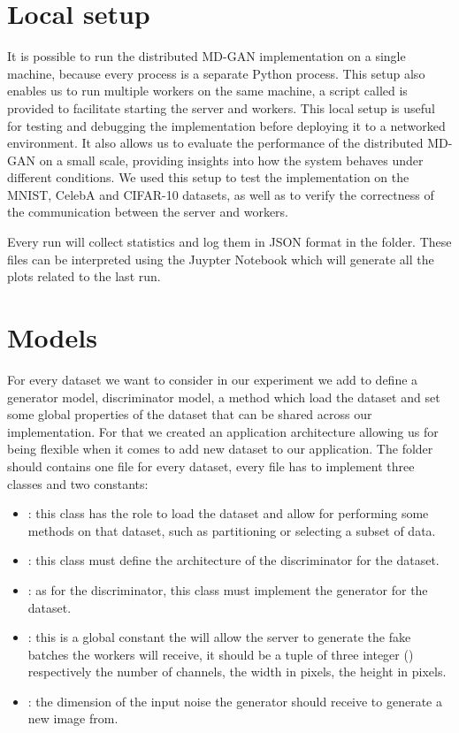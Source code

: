 \section{Local setup}
It is possible to run the distributed MD-GAN implementation on a single machine, because every process is a separate Python process. This setup also enables us to run multiple workers on the same machine, a script called  is provided to facilitate starting the server and workers. This local setup is useful for testing and debugging the implementation before deploying it to a networked environment. It also allows us to evaluate the performance of the distributed MD-GAN on a small scale, providing insights into how the system behaves under different conditions. We used this setup to test the implementation on the MNIST, CelebA and CIFAR-10 datasets, as well as to verify the correctness of the communication between the server and workers.

Every run will collect statistics and log them in JSON format in the  folder. These files can be interpreted using the Juypter Notebook  which will generate all the plots related to the last run.

\section{Models}
For every dataset we want to consider in our experiment we add to define a generator model, discriminator model, a method which load the dataset and set some global properties of the dataset that can be shared across our implementation. For that we created an application architecture allowing us for being flexible when it comes to add new dataset to our application. The folder  should contains one file for every dataset, every file has to implement three classes and two constants: 
\begin{itemize}
    \item {}: this class has the role to load the dataset and allow for performing some methods on that dataset, such as partitioning or selecting a subset of data.
    \item {}: this class must define the architecture of the discriminator for the dataset.
    \item {}: as for the discriminator, this class must implement the generator for the dataset.
    \item {}: this is a global constant the will allow the server to generate the fake batches the workers will receive, it should be a tuple of three integer () respectively the number of channels, the width in pixels, the height in pixels.
    \item {}: the dimension of the input noise the generator should receive to generate a new image from.
\end{itemize}

